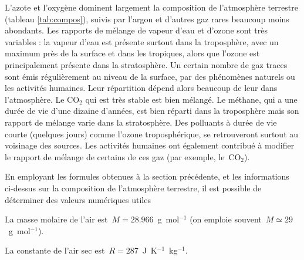 

\sk
L'azote et l'oxygène dominent largement la composition de l'atmosphère terrestre (tableau \ref{tab:compos}), suivis par l'argon et d'autres gaz rares beaucoup moins abondants. Les rapports de mélange de vapeur d'eau et d'ozone sont très variables : la vapeur d'eau est présente surtout dans la troposphère, avec un maximum près de la surface et dans les tropiques, alors que l'ozone est principalement présente dans la stratosphère. Un certain nombre de gaz traces sont émis régulièrement au niveau de la surface, par des phénomènes naturels ou les activités humaines. Leur répartition dépend alors beaucoup de leur  dans l'atmosphère. Le CO$_2$ qui est très stable est bien mélangé. Le méthane, qui a une durée de vie d'une dizaine d'années, est bien réparti dans la troposphère mais son rapport de mélange varie dans la stratosphère. Des polluants à durée de vie courte (quelques jours) comme l'ozone troposphérique, se retrouveront surtout au voisinage des sources. Les activités humaines ont également contribué à modifier le rapport de mélange de certains de ces gaz (par exemple, le~CO$_2$).

\sk
\begin{finger}
\item En employant les formules obtenues à la section précédente, et les informations ci-dessus sur la composition de l'atmosphère terrestre, il est possible de déterminer des valeurs numériques utiles
\begin{citemize}
\item La masse molaire de l'air est~$M = 28.966$~g~mol$^{-1}$ (on emploie souvent~$M \simeq 29$~g~mol$^{-1}$). 
\item La constante de l'air sec est~$R = 287$~J~K$^{-1}$~kg$^{-1}$.
\end{citemize}  
\end{finger}

